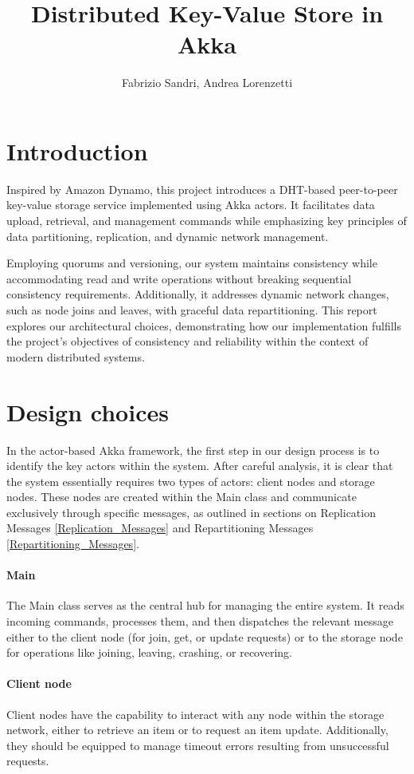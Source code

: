 \documentclass[a4paper, 11pt]{article}
\title{Distributed Key-Value Store in Akka}
\author{Fabrizio Sandri, Andrea Lorenzetti}
\begin{document}
\maketitle

\section{Introduction}

Inspired by Amazon Dynamo, this project introduces a DHT-based peer-to-peer key-value storage service implemented using Akka actors. It facilitates data upload, retrieval, and management commands while emphasizing key principles of data partitioning, replication, and dynamic network management.

Employing quorums and versioning, our system maintains consistency while accommodating read and write operations without breaking sequential consistency requirements. Additionally, it addresses dynamic network changes, such as node joins and leaves, with graceful data repartitioning. This report explores our architectural choices, demonstrating how our implementation fulfills the project's objectives of consistency and reliability within the context of modern distributed systems.

\section{Design choices}

In the actor-based Akka framework, the first step in our design process is to identify the key actors within the system. After careful analysis, it is clear that the system essentially requires two types of actors: client nodes and storage nodes. These nodes are created within the Main class and communicate exclusively through specific messages, as outlined in sections on Replication Messages \ref{Replication_Messages} and Repartitioning Messages \ref{Repartitioning_Messages}.

\paragraph{Main} The Main class serves as the central hub for managing the entire system. It reads incoming commands, processes them, and then dispatches the relevant message either to the client node (for join, get, or update requests) or to the storage node for operations like joining, leaving, crashing, or recovering.  

\paragraph{Client node} Client nodes have the capability to interact with any node within the storage network, either to retrieve an item or to request an item update. Additionally, they should be equipped to manage timeout errors resulting from unsuccessful requests.
\end{document}
